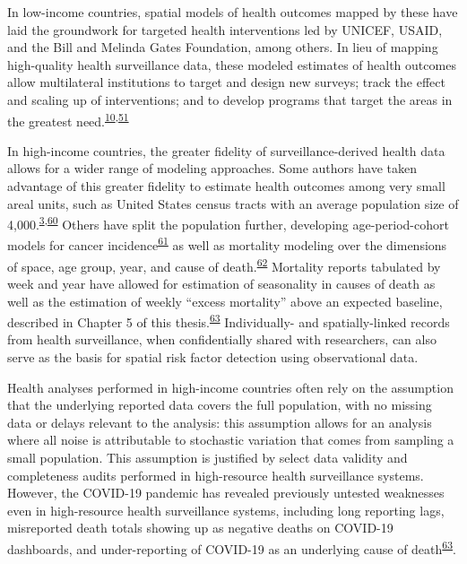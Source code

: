 \documentclass[
]{article}
\begin{document}
In low-income countries, spatial models of health outcomes mapped by these have laid the groundwork for targeted health interventions led by UNICEF, USAID, and the Bill and Melinda Gates Foundation, among others. In lieu of mapping high-quality health surveillance data, these modeled estimates of health outcomes allow multilateral institutions to target and design new surveys; track the effect and scaling up of interventions; and to develop programs that target the areas in the greatest need.\textsuperscript{\protect\hyperlink{ref-Diggle2016}{10},\protect\hyperlink{ref-Pigott2015}{51}}

In high-income countries, the greater fidelity of surveillance-derived health data allows for a wider range of modeling approaches. Some authors have taken advantage of this greater fidelity to estimate health outcomes among very small areal units, such as United States census tracts with an average population size of 4,000.\textsuperscript{\protect\hyperlink{ref-Dwyer-Lindgren2017}{3},\protect\hyperlink{ref-Zhang2014}{60}} Others have split the population further, developing age-period-cohort models for cancer incidence\textsuperscript{\protect\hyperlink{ref-Papoila2014}{61}} as well as mortality modeling over the dimensions of space, age group, year, and cause of death.\textsuperscript{\protect\hyperlink{ref-Dwyer-Lindgren2016}{62}} Mortality reports tabulated by week and year have allowed for estimation of seasonality in causes of death as well as the estimation of weekly ``excess mortality'' above an expected baseline, described in Chapter 5 of this thesis.\textsuperscript{\protect\hyperlink{ref-Weinberger2020a}{63}} Individually- and spatially-linked records from health surveillance, when confidentially shared with researchers, can also serve as the basis for spatial risk factor detection using observational data.

Health analyses performed in high-income countries often rely on the assumption that the underlying reported data covers the full population, with no missing data or delays relevant to the analysis: this assumption allows for an analysis where all noise is attributable to stochastic variation that comes from sampling a small population. This assumption is justified by select data validity and completeness audits performed in high-resource health surveillance systems. However, the COVID-19 pandemic has revealed previously untested weaknesses even in high-resource health surveillance systems, including long reporting lags, misreported death totals showing up as negative deaths on COVID-19 dashboards, and under-reporting of COVID-19 as an underlying cause of death\textsuperscript{\protect\hyperlink{ref-Weinberger2020a}{63}}.
\end{document}
